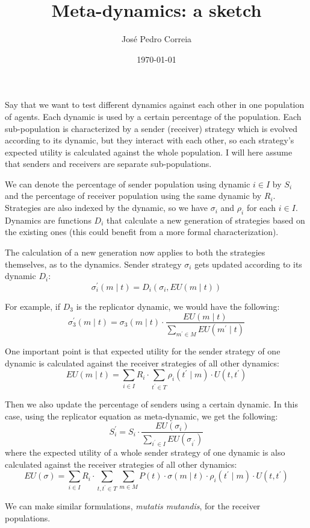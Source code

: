 \documentclass[a4paper]{article}
\title{Meta-dynamics: a sketch}
\author{José Pedro Correia}
\date{\today}
\begin{document}
\maketitle

Say that we want to test different dynamics against each other in one population of agents.
Each dynamic is used by a certain percentage of the population.
Each sub-population is characterized by a sender (receiver) strategy which is evolved according to its dynamic, but they interact with each other, so each strategy's expected utility is calculated against the whole population.
I will here assume that senders and receivers are separate sub-populations.

We can denote the percentage of sender population using dynamic $i \in I$ by $S_i$ and the percentage of receiver population using the same dynamic by $R_i$.
Strategies are also indexed by the dynamic, so we have $\sigma_i$ and $\rho_i$ for each $i \in I$.
Dynamics are functions $D_i$ that calculate a new generation of strategies based on the existing ones (this could benefit from a more formal characterization).

The calculation of a new generation now applies to both the strategies themselves, as to the dynamics.
Sender strategy $\sigma_i$ gets updated according to its dynamic $D_i$:
$$
\sigma_i^\prime(m \mid t) = D_i(\sigma_i, EU(m \mid t))
$$

For example, if $D_3$ is the replicator dynamic, we would have the following:
$$
\sigma_3^\prime(m \mid t) = \sigma_3(m \mid t) \cdot \frac{EU(m \mid t)}{\sum_{m^\prime \in M} EU(m^\prime \mid t)}
$$

One important point is that expected utility for the sender strategy of one dynamic is calculated against the receiver strategies of all other dynamics:
$$
EU(m \mid t) = \sum_{i \in I} R_i \cdot \sum_{t^\prime \in T} \rho_i(t^\prime \mid m) \cdot U(t, t^\prime)
$$

Then we also update the percentage of senders using a certain dynamic.
In this case, using the replicator equation as meta-dynamic, we get the following:
$$
S_i^\prime = S_i \cdot \frac{EU(\sigma_i)}{\sum_{i^\prime \in I} EU(\sigma_{i^\prime})}
$$
where the expected utility of a whole sender strategy of one dynamic is also calculated against the receiver strategies of all other dynamics:
$$
EU(\sigma) = \sum_{i \in I} R_i \cdot \sum_{t, t^\prime \in T} \sum_{m \in M} P(t) \cdot \sigma(m \mid t) \cdot \rho_i(t^\prime \mid m) \cdot U(t, t^\prime)
$$

We can make similar formulations, \emph{mutatis mutandis}, for the receiver populations.
	
\end{document}
